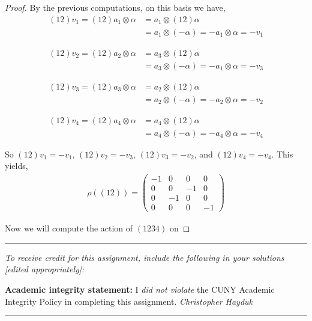 \documentclass[11pt, reqno]{amsart}
\theoremstyle{plain}
\theoremstyle{definition}
\theoremstyle{example}
\begin{document}
\begin{proof}
By the previous computations, on this basis we have,
\begin{align*}
(12)v_1 = (12)a_1 \otimes \alpha &= a_1 \otimes (12)\alpha\\
&= a_1 \otimes (-\alpha) = -a_1 \otimes \alpha = -v_1
\end{align*}

\begin{align*}
(12)v_2 = (12)a_2 \otimes \alpha &= a_3 \otimes (12)\alpha\\
&= a_3 \otimes (-\alpha) = -a_1 \otimes \alpha = -v_3
\end{align*}

\begin{align*}
(12)v_3 = (12)a_3 \otimes \alpha &= a_2 \otimes (12)\alpha\\
&= a_2 \otimes (-\alpha) = -a_2 \otimes \alpha = -v_2
\end{align*}

\begin{align*}
(12)v_4 = (12)a_4 \otimes \alpha &= a_4 \otimes (12)\alpha\\
&= a_4 \otimes (-\alpha) = -a_4 \otimes \alpha = -v_4
\end{align*}

So $(12)v_1 = -v_1$, $(12)v_2 = -v_3$, $(12)v_3 = -v_2$, and $(12)v_4 = -v_4$. This yields,
\begin{align*}
\rho((12)) = \begin{pmatrix}
-1 & 0 & 0 & 0\\
0 & 0 & -1 & 0\\
0 & -1 & 0 & 0\\
0 & 0 & 0 & -1
\end{pmatrix}
\end{align*}

Now we will compute the action of $(1234)$ on 
\end{proof}

\vfill


\hrule
\emph{\small To receive credit for this assignment, include the following in your solutions [edited appropriately]:}

\smallskip

\textbf{Academic integrity statement:} I \emph{did not violate} the CUNY Academic Integrity Policy in completing this assignment. \hfill \emph{Christopher Hayduk}

\medskip
\hrule

\vfill

\pagebreak
\end{document}
